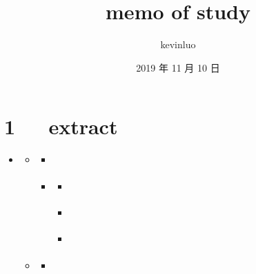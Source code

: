 \documentclass[letterpaper,12pt,english]{sphinxmanual}
\title{memo of study}
\date{2019 年 11 月 10 日}
\author{kevinluo}
\begin{document}
\pagestyle{empty}
\sphinxmaketitle
\pagestyle{plain}
\sphinxtableofcontents
\pagestyle{normal}
\label{\detokenize{index::doc}}



\chapter{1   extract}
\label{\detokenize{000misc/extract:extract}}\label{\detokenize{000misc/extract::doc}}
\begin{sphinxShadowBox}
\begin{itemize}
\item {} 
\label{\detokenize{000misc/extract:id8}}{\hyperref[\detokenize{000misc/extract:extract}]{}}
\begin{itemize}
\item {} 
\label{\detokenize{000misc/extract:id9}}{\hyperref[\detokenize{000misc/extract:id2}]{}}
\begin{itemize}
\item {} 
\label{\detokenize{000misc/extract:id10}}{\hyperref[\detokenize{000misc/extract:id3}]{}}

\item {} 
\label{\detokenize{000misc/extract:id11}}{\hyperref[\detokenize{000misc/extract:c4d-3dmax-maya}]{}}
\begin{itemize}
\item {} 
\label{\detokenize{000misc/extract:id12}}{\hyperref[\detokenize{000misc/extract:dmax-c4d}]{}}

\item {} 
\label{\detokenize{000misc/extract:id13}}{\hyperref[\detokenize{000misc/extract:dmaxmayac4d}]{}}

\item {} 
\label{\detokenize{000misc/extract:id14}}{\hyperref[\detokenize{000misc/extract:c4d-c4d}]{}}

\end{itemize}

\end{itemize}

\item {} 
\label{\detokenize{000misc/extract:id15}}{\hyperref[\detokenize{000misc/extract:id4}]{}}
\begin{itemize}
\item {} 
\label{\detokenize{000misc/extract:id16}}{\hyperref[\detokenize{000misc/extract:graphviz}]{}}


\end{itemize}
\end{itemize}
\end{itemize}
\end{sphinxShadowBox}
\end{document}
